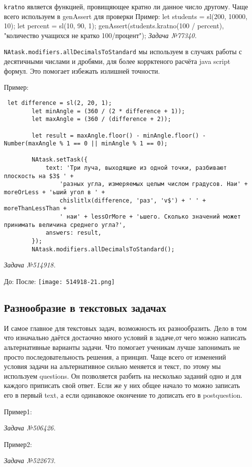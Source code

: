\texttt{kratno} является функцией, провищяющее кратно ли данное число другому. Чаще всего используем в genAssert для проверки
Пример:
let students = sl(200, 10000, 10);
let percent = sl(10, 90, 1);
genAssert(students.kratno(100 / percent), "количество учащихся не кратко 100/процент");
\textsl{Задача №77340.}

\texttt{NAtask.modifiers.allDecimalsToStandard} мы используем в случаях работы с десятичными числами и дробями, для более коррктеного расчёта java script формул.
 Это помогает избежать излишней точности.

Пример:
\begin{lstlisting}
 let difference = sl(2, 20, 1);
        let minAngle = (360 / (2 * difference + 1));
        let maxAngle = (360 / (difference + 2));

        let result = maxAngle.floor() - minAngle.floor() - Number(maxAngle % 1 == 0 || minAngle % 1 == 0);

        NAtask.setTask({
            text: 'Три луча, выходящие из одной точки, разбивают плоскость на $3$ ' +
                'разных угла, измеряемых целым числом градусов. Наи' + moreOrLess + 'ьший угол в ' +
                chislitlx(difference, 'раз', 'v$') + ' ' + moreThanLessThan +
                ' наи' + lessOrMore + 'ьшего. Сколько значений может принимать величина среднего угла?',
            answers: result,
        });
        NAtask.modifiers.allDecimalsToStandard();
\end{lstlisting}       
\textsl{Задача №514918.}


До:
После:
\texttt{[image: 514918-21.png]}

\subsection{Разнообразие в текстовых задачах}
И самое главное для текстовых задач, возможность их разнообразить. Дело в том что изначально даётся достаочно много условий в задаче,от чего можно написать альтернативные варианты задачи. Что помогает ученикам лучше запонимать не просто последовательность решения, а принцип.
Чаще всего от изменений условия задачи на альтернативное сильно меняется и текст, по этому мы используем questions. Он позволяется разбить на несколько заданий одно и для каждого приписать свой ответ. Если же у них общее начало то можно записать его в первый text, а если одинавокое окончение то 
дописать его в postquestion.

Пример1: 
 
\textsl{Задача №506426.}

Пример2:
 
\textsl{Задача №522673.}
